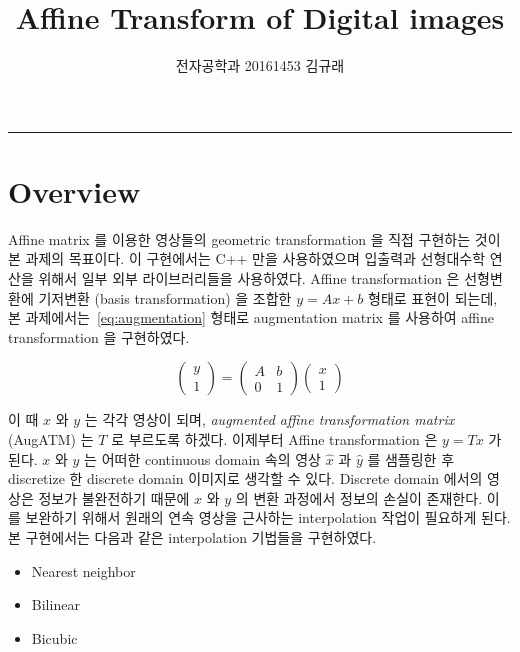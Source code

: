 \documentclass[a4paper, 12p]{paper}
\date{\vspace{-5ex}}
\title{Affine Transform of Digital images}
\author{전자공학과 20161453 김규래}
\begin{document}
 
\maketitle\hrule{}\bigskip

\section{Overview}
Affine matrix 를 이용한 영상들의 geometric transformation 을 직접 구현하는 것이 본 과제의 목표이다. 이 구현에서는 C++ 만을 사용하였으며 입출력과 선형대수학 연산을 위해서 일부 외부 라이브러리들을 사용하였다. Affine transformation 은 선형변환에 기저변환 (basis transformation) 을 조합한 $y = Ax + b$ 형태로 표현이 되는데, 본 과제에서는~\ref{eq:augmentation} 형태로 augmentation matrix 를 사용하여 affine transformation 을 구현하였다.

\begin{equation}
  \left(
  \begin{array}{c}
    y \\
    1
  \end{array}
  \right)
  =
  \left(
  \begin{array}{c|c}
    A & b \\
    0 & 1
  \end{array}
  \right)
  \left(
  \begin{array}{c}
    x \\
    1
  \end{array}
  \right)\label{eq:augmentation}
\end{equation}

이 때 $x$ 와 $y$ 는 각각 영상이 되며, \textit{augmented affine transformation matrix} (AugATM) 는 $T$ 로 부르도록 하겠다. 이제부터 Affine transformation 은 $y = Tx$ 가 된다. $x$ 와 $y$ 는 어떠한 continuous domain 속의 영상 $\hat{x}$ 과 $\hat{y}$ 를 샘플링한 후 discretize 한 discrete domain 이미지로 생각할 수 있다. Discrete domain 에서의 영상은 정보가 불완전하기 때문에 $x$ 와 $y$ 의 변환 과정에서 정보의 손실이 존재한다. 이를 보완하기 위해서 원래의 연속 영상을 근사하는 interpolation 작업이 필요하게 된다. 본 구현에서는 다음과 같은 interpolation 기법들을 구현하였다.

\begin{itemize}
  \item Nearest neighbor
  \item Bilinear 
  \item Bicubic
\end{itemize}
\end{document}
